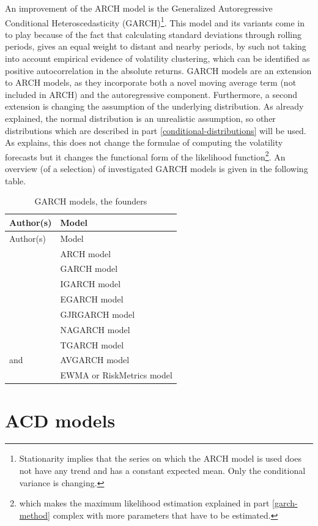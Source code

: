 \documentclass[a4paper, nobind]{templates/ociamthesis}
\begin{document}
\noindent An improvement of the ARCH model is the Generalized Autoregressive Conditional Heteroscedasticity (GARCH)\footnote{Stationarity implies that the series on which the ARCH model is used does not have any trend and has a constant expected mean. Only the conditional variance is changing.}. This model and its variants come in to play because of the fact that calculating standard deviations through rolling periods, gives an equal weight to distant and nearby periods, by such not taking into account empirical evidence of volatility clustering, which can be identified as positive autocorrelation in the absolute returns. GARCH models are an extension to ARCH models, as they incorporate both a novel moving average term (not included in ARCH) and the autoregressive component. Furthermore, a second extension is changing the assumption of the underlying distribution. As already explained, the normal distribution is an unrealistic assumption, so other distributions which are described in part \ref{conditional-distributions} will be used. As \textcite{alexander2008} explains, this does not change the formulae of computing the volatility forecasts but it changes the functional form of the likelihood function\footnote{which makes the maximum likelihood estimation explained in part \ref{garch-method} complex with more parameters that have to be estimated.}. An overview (of a selection) of investigated GARCH models is given in the following table.

\newpage

\begin{longtable}[]{@{}ll@{}}
\caption{GARCH models, the founders}\tabularnewline
\toprule
Author(s) & Model\tabularnewline
\midrule
\endfirsthead
\toprule
Author(s) & Model\tabularnewline
\midrule
\endhead
\textcite{engle1982} & ARCH model\tabularnewline
\textcite{bollerslev1986} & GARCH model\tabularnewline
\textcite{bollerslev1986} & IGARCH model\tabularnewline
\textcite{nelson1991} & EGARCH model\tabularnewline
\textcite{glosten1993} & GJRGARCH model\tabularnewline
\textcite{engle1993} & NAGARCH model\tabularnewline
\textcite{zakoian1994} & TGARCH model\tabularnewline
\textcite{taylor1986} and \textcite{schwert1989} & AVGARCH model\tabularnewline
\textcite{morganguarantytrustcompany1996} & EWMA or RiskMetrics model\tabularnewline
\bottomrule
\end{longtable}

\hypertarget{acd-models}{%
\section{ACD models}\label{acd-models}}
\end{document}
